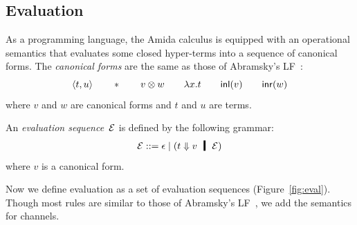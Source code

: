 \subsection{Evaluation}
As a programming language, the Amida calculus is equipped with an
operational semantics that evaluates some closed hyper-terms into a sequence
of canonical forms.
The \textit{canonical forms} are the same as those of Abramsky's
LF~\citep{abramsky1993computational}:
\[
 \langle{t,u}\rangle\qquad \ast\qquad v\otimes w\qquad \lambda
 x.t\qquad \mathsf{inl}({v})\qquad\mathsf{inr}({w})
\]
where $v$ and $w$ are canonical forms and $t$ and $u$ are terms.

An \textit{evaluation
sequence}~$\mathcal{E}$ is defined by the following
grammar:
\[
 \hypere ::= \epsilon\mid (t\eval v\hmid \hypere)
\]
where $v$ is a canonical form.

Now we define evaluation as a set of evaluation sequences
(Figure~\ref{fig:eval}).
Though most rules are similar to those of Abramsky's
LF~\citep{abramsky1993computational},
we add the semantics for channels.

